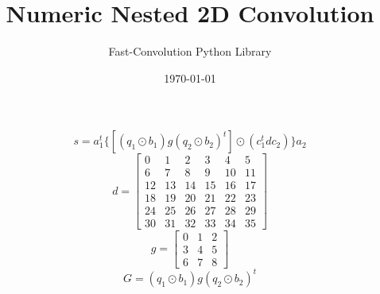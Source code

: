 \documentclass{article}%
\title{Numeric Nested 2D Convolution}%
\author{Fast{-}Convolution Python Library}%
\date{\today}%
\begin{document}
%
\normalsize%
\maketitle%
\[%
s=a_1^t \{[(q_1 \odot b_1) g (q_2 \odot b_2)^t] \odot (c_1^t d c_2)\}a_2%
\]%
\[%
d = \left[\begin{matrix}0 & 1 & 2 & 3 & 4 & 5\\6 & 7 & 8 & 9 & 10 & 11\\12 & 13 & 14 & 15 & 16 & 17\\18 & 19 & 20 & 21 & 22 & 23\\24 & 25 & 26 & 27 & 28 & 29\\30 & 31 & 32 & 33 & 34 & 35\end{matrix}\right]%
\]%
\[%
g = \left[\begin{matrix}0 & 1 & 2\\3 & 4 & 5\\6 & 7 & 8\end{matrix}\right]%
\]%
\[%
G = (q_1 \odot b_1) g (q_2 \odot b_2)^t%
\]%
\end{document}
